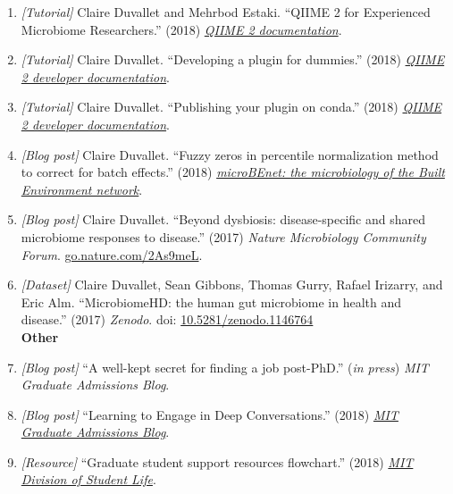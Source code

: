 \documentclass[10pt]{article}
\makeatletter
\newlength{\bibhang}
\newlength{\bibsep}
 {\@listi \global\bibsep\itemsep \global\advance\bibsep by\parsep}
\newenvironment{bibsection}%
        {\begin{enumerate}{}{%
       \setlength{\leftmargin}{\bibhang}%
       \setlength{\itemindent}{-\leftmargin}%
       \setlength{\itemsep}{\bibsep}%
       \setlength{\parsep}{\z@}%
        \setlength{\partopsep}{0pt}%
        \setlength{\topsep}{0pt}}}
        {\end{enumerate}\vspace{-.6\baselineskip}}
\makeatother
\begin{document}
\begin{bibsection}
	\item \textit{[Tutorial]} Claire Duvallet and Mehrbod Estaki. ``QIIME 2 for Experienced Microbiome Researchers.'' (2018) \href{https://docs.qiime2.org/latest/tutorials/qiime2-for-experienced-microbiome-researchers/}{\emph{QIIME 2 documentation}}.

	\item \textit{[Tutorial]} Claire Duvallet. ``Developing a plugin for dummies.'' (2018) \href{https://dev.qiime2.org/latest/tutorials/first-plugin-tutorial/}{\emph{QIIME 2 developer documentation}}.	
	
	\item \textit{[Tutorial]} Claire Duvallet. ``Publishing your plugin on conda.'' (2018) \href{https://dev.qiime2.org/latest/tutorials/conda-tutorial/}{\emph{QIIME 2 developer documentation}}.	

	\item \textit{[Blog post]} Claire Duvallet. ``Fuzzy zeros in percentile normalization method to correct for batch effects.'' (2018) \href{https://microbe.net/2018/06/04/fuzzy-zeros-in-percentile-normalization-method-to-correct-for-batch-effects/}{\emph{microBEnet: the microbiology of the Built Environment network}}.	
		
	\item \textit{[Blog post]} Claire Duvallet. ``Beyond dysbiosis: disease-specific and shared microbiome responses to disease.'' (2017)
		\emph{Nature Microbiology Community Forum}. \href{http://go.nature.com/2As9meL}{go.nature.com/2As9meL}.
		
	\item \textit{[Dataset]} Claire Duvallet, Sean Gibbons, Thomas Gurry, Rafael Irizarry, and Eric Alm. ``MicrobiomeHD: the human gut microbiome in health and disease.'' (2017) 
		\emph{Zenodo}. doi: \href{https://zenodo.org/record/1146764}{10.5281/zenodo.1146764} \\

\textbf{Other}

	\item \textit{[Blog post]} ``A well-kept secret for finding a job post-PhD.'' (\textit{in press}) \emph{MIT Graduate Admissions Blog}.	
		
	\item \textit{[Blog post]} ``Learning to Engage in Deep Conversations.'' (2018) \href{https://gradadmissions.mit.edu/blog/learning-engage-deep-conversations}{\emph{MIT Graduate Admissions Blog}}.	
		
	\item \textit{[Resource]} ``Graduate student support resources flowchart.'' (2018) \href{https://dslx.mit.edu/resources/struggling-grad-school-find-ways-forward}{\emph{MIT Division of Student Life}}.			
\end{bibsection}
\end{document}

